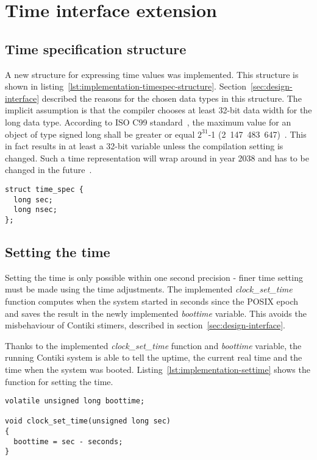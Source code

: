 
\section{Time interface extension}
\subsection{Time specification structure}
A new structure for expressing time values was implemented.
This structure is shown in listing~\ref{lst:implementation-timespec-structure}.
Section~\ref{sec:design-interface} described the reasons for the chosen data types
in this structure.
The implicit assumption is that the compiler chooses at least 32-bit data width for the long data type.
According to ISO C99 standard~\cite{c99},
the maximum value for an object of type signed long
shall be greater or equal $2^{31}$-1 (2~147~483~647)~\cite{c99}.
This in fact results in at least a 32-bit variable unless the compilation setting is changed.
Such a time representation will wrap around in year 2038
and has to be changed in the future~\cite{posix}.
\begin{lstlisting}[caption={Time specification structure},label={lst:implementation-timespec-structure}]
struct time_spec {
  long sec;
  long nsec;
};
\end{lstlisting}


\subsection{Setting the time}
Setting the time is only possible within one second precision -
finer time setting must be made using the time adjustments.
The implemented {\it{clock\_set\_time}} function computes when the system started
in seconds since the POSIX epoch and saves the result in the newly implemented {\it{boottime}} variable.
This avoids the misbehaviour of Contiki stimers, described in section~\ref{sec:design-interface}.

Thanks to the implemented {\it{clock\_set\_time}} function and {\it{boottime}} variable,
the running Contiki system is able to tell the uptime, the current real time and the time when the system was booted.
Listing~\ref{lst:implementation-settime} shows the function for setting the time.
\begin{lstlisting}[caption={Function for setting the time},label={lst:implementation-settime}]
volatile unsigned long boottime;

void clock_set_time(unsigned long sec)
{
  boottime = sec - seconds;
}
\end{lstlisting}


